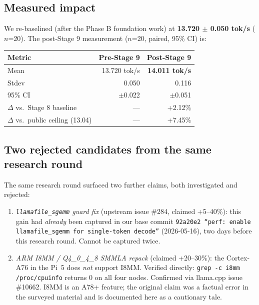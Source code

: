 \documentclass[10pt,a4paper]{article}
\begin{document}
\subsection{Measured impact}

We re-baselined (after the Phase B foundation work) at \textbf{13.720 \(\pm\) 0.050 tok/s} ($n$=20). The post-Stage 9 measurement ($n$=20, paired, 95\% CI) is:

\begin{table}[H]
\centering
\small
\begin{tabular}{lrr}
\toprule
\textbf{Metric}  & \textbf{Pre-Stage 9} & \textbf{Post-Stage 9} \\
\midrule
Mean             & 13.720 tok/s & \textbf{14.011 tok/s} \\
Stdev            & 0.050        & 0.116                 \\
95\% CI          & $\pm$0.022   & $\pm$0.051            \\
\midrule
$\Delta$ vs.\ Stage 8 baseline & --- & +2.12\% \\
$\Delta$ vs.\ public ceiling (13.04) & --- & +7.45\% \\
\bottomrule
\end{tabular}
\end{table}

\subsection{Two rejected candidates from the same research round}

The same research round surfaced two further claims, both investigated and rejected:

\begin{enumerate}
  \item \emph{\texttt{llamafile\_sgemm} guard fix} (upstream issue \#284, claimed +5--40\%): this gain had \emph{already} been captured in our base commit \texttt{92a20e2 ``perf: enable llamafile\_sgemm for single-token decode''} (2026-05-16), two days before this research round. Cannot be captured twice.
  \item \emph{ARM I8MM / Q4\_0\_4\_8 SMMLA repack} (claimed +20--30\%): the Cortex-A76 in the Pi~5 does \emph{not} support I8MM. Verified directly: \texttt{grep -c i8mm /proc/cpuinfo} returns 0 on all four nodes. Confirmed via llama.cpp issue \#10662. I8MM is an A78+ feature; the original claim was a factual error in the surveyed material and is documented here as a cautionary tale.
\end{enumerate}
\end{document}
